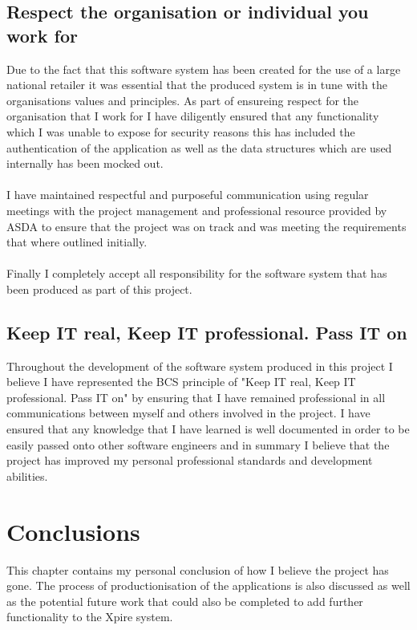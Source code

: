 \documentclass[a4paper,11pt]{report}
\begin{document}
\section{Respect the organisation or individual you work for}
Due to the fact that this software system has been created for the use of a large national retailer it was essential that the produced system is in tune with the organisations values and principles. 
As part of ensureing respect for the organisation that I work for I have diligently ensured that any functionality which I was unable to expose for security reasons this has included the authentication of the application as well as the data structures which are used internally has been mocked out.
\\
\\
I have maintained respectful and purposeful communication using regular meetings with the project management and professional resource provided by ASDA to ensure that the project was on track and was meeting the requirements that where outlined initially.
\\
\\
Finally I completely accept all responsibility for the software system that has been produced as part of this project. 

\section{Keep IT real, Keep IT professional. Pass IT on}
Throughout the development of the software system produced in this project I believe I have represented the BCS principle of 
"Keep IT real, Keep IT professional. Pass IT on" by ensuring that I have remained professional in all communications between
myself and others involved in the project. I have ensured that any knowledge that I have learned is well documented in order
to be easily passed onto other software engineers and in summary I believe that the project has improved my personal professional
standards and development abilities.

\chapter{Conclusions}
This chapter contains my personal conclusion of how I believe the project has gone. The process of productionisation of the applications is also discussed as well as the potential future work that could also be completed to add further functionality to the Xpire system. 
\end{document}
